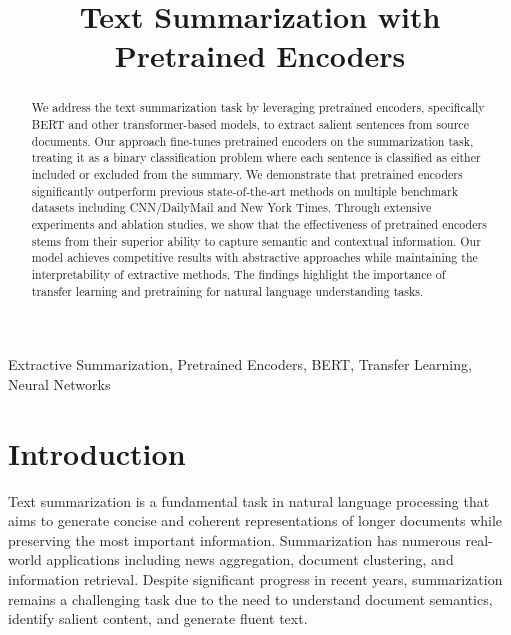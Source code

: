 \documentclass[conference]{IEEEtran}
\begin{document}
\title{Text Summarization with Pretrained Encoders}
\date{}%

\author{
}

\maketitle

\begin{abstract}
We address the text summarization task by leveraging pretrained encoders, specifically BERT and other transformer-based models, to extract salient sentences from source documents. Our approach fine-tunes pretrained encoders on the summarization task, treating it as a binary classification problem where each sentence is classified as either included or excluded from the summary. We demonstrate that pretrained encoders significantly outperform previous state-of-the-art methods on multiple benchmark datasets including CNN/DailyMail and New York Times. Through extensive experiments and ablation studies, we show that the effectiveness of pretrained encoders stems from their superior ability to capture semantic and contextual information. Our model achieves competitive results with abstractive approaches while maintaining the interpretability of extractive methods. The findings highlight the importance of transfer learning and pretraining for natural language understanding tasks.
\end{abstract}

\begin{IEEEkeywords}
Extractive Summarization, Pretrained Encoders, BERT, Transfer Learning, Neural Networks
\end{IEEEkeywords}

\section{Introduction}

Text summarization is a fundamental task in natural language processing that aims to generate concise and coherent representations of longer documents while preserving the most important information. Summarization has numerous real-world applications including news aggregation, document clustering, and information retrieval. Despite significant progress in recent years, summarization remains a challenging task due to the need to understand document semantics, identify salient content, and generate fluent text.
\end{document}
